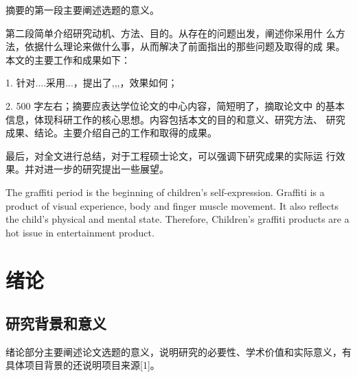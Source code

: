 \documentclass[12pt]{zjutthesis}
\begin{document}
\zjutpreface



\frontmatter
{} %
\setcounter{page}{2}
\begin{AbstractCn}
  摘要的第一段主要阐述选题的意义。

  第二段简单介绍研究动机、方法、目的。从存在的问题出发，阐述你采用什
  么方法，依据什么理论来做什么事，从而解决了前面指出的那些问题及取得的成
  果。本文的主要工作和成果如下：

  1. 针对....采用...，提出了,,,，效果如何；

  2. 500 字左右；摘要应表达学位论文的中心内容，简短明了，摘取论文中
  的基本信息，体现科研工作的核心思想。内容包括本文的目的和意义、研究方法、
  研究成果、结论。主要介绍自己的工作和取得的成果。

  最后，对全文进行总结，对于工程硕士论文，可以强调下研究成果的实际运
  行效果。并对进一步的研究提出一些展望。

\end{AbstractCn}

\begin{AbstractEn}
  The graffiti period is the beginning of children's self-expression. Graffiti is a
  product of visual experience, body and finger muscle movement. It also reflects the
  child's physical and mental state. Therefore, Children's graffiti products are a hot issue
  in entertainment product.

\end{AbstractEn}


\tableofcontents
\clearpage
\listoffigures
\listoffigureEng
\clearpage
\listoftables
\listoftableEng






\mainmatter
\chapter{绪论}
\section{研究背景和意义}
绪论部分主要阐述论文选题的意义，说明研究的必要性、学术价值和实际意义，有具体项目背景的还说明项目来源[1]。
\end{document}
